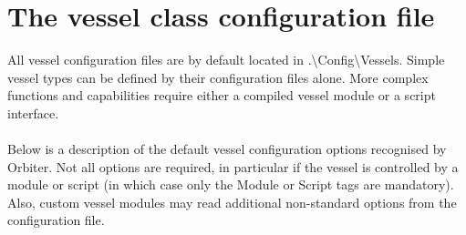 \documentclass[Orbiter Developer Manual.tex]{subfiles}
\begin{document}
\section{The vessel class configuration file}
All vessel configuration files are by default located in .\textbackslash Config\textbackslash Vessels. Simple vessel types can be defined by their configuration files alone. More complex functions and capabilities require either a compiled vessel module or a script interface.\\
\\
Below is a description of the default vessel configuration options recognised by Orbiter. Not all options are required, in particular if the vessel is controlled by a module or script (in which case only the Module or Script tags are mandatory). Also, custom vessel modules may read additional non-standard options from the configuration file.
\end{document}
